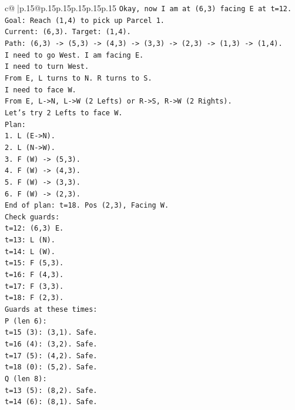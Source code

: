 \documentclass{article}
\begin{document}
{\begin{supertabular}{c@{$\;$}|p{.15\linewidth}@{}p{.15\linewidth}p{.15\linewidth}p{.15\linewidth}p{.15\linewidth}p{.15\linewidth}}
{{{\texttt{Okay, now I am at (6,3) facing E at t=12.} \\
\texttt{Goal: Reach (1,4) to pick up Parcel 1.} \\
\texttt{Current: (6,3). Target: (1,4).} \\
\texttt{Path: (6,3) {-}> (5,3) {-}> (4,3) {-}> (3,3) {-}> (2,3) {-}> (1,3) {-}> (1,4).} \\
\texttt{I need to go West. I am facing E.} \\
\texttt{I need to turn West.} \\
\texttt{From E, L turns to N. R turns to S.} \\
\texttt{I need to face W.} \\
\texttt{From E, L{-}>N, L{-}>W (2 Lefts) or R{-}>S, R{-}>W (2 Rights).} \\
\texttt{Let's try 2 Lefts to face W.} \\
\texttt{Plan:} \\
\texttt{1. L (E{-}>N).} \\
\texttt{2. L (N{-}>W).} \\
\texttt{3. F (W) {-}> (5,3).} \\
\texttt{4. F (W) {-}> (4,3).} \\
\texttt{5. F (W) {-}> (3,3).} \\
\texttt{6. F (W) {-}> (2,3).} \\
\texttt{End of plan: t=18. Pos (2,3), Facing W.} \\
\texttt{Check guards:} \\
\texttt{t=12: (6,3) E.} \\
\texttt{t=13: L (N).} \\
\texttt{t=14: L (W).} \\
\texttt{t=15: F (5,3).} \\
\texttt{t=16: F (4,3).} \\
\texttt{t=17: F (3,3).} \\
\texttt{t=18: F (2,3).} \\
\texttt{Guards at these times:} \\
\texttt{P (len 6):} \\
\texttt{t=15 (3): (3,1). Safe.} \\
\texttt{t=16 (4): (3,2). Safe.} \\
\texttt{t=17 (5): (4,2). Safe.} \\
\texttt{t=18 (0): (5,2). Safe.} \\
\texttt{Q (len 8):} \\
\texttt{t=13 (5): (8,2). Safe.} \\
\texttt{t=14 (6): (8,1). Safe.} \\
}}}
\end{supertabular}}
\end{document}
